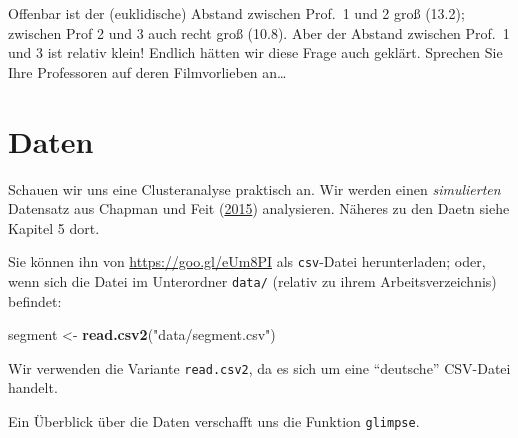 \documentclass[12pt,ngerman,]{book}
\makeatletter
\newenvironment{Shaded}{\begin{snugshade}}{\end{snugshade}}
\newcommand{\KeywordTok}[1]{\textcolor[rgb]{0.13,0.29,0.53}{\textbf{{#1}}}}
\newcommand{\StringTok}[1]{\textcolor[rgb]{0.31,0.60,0.02}{{#1}}}
\newcommand{\CommentTok}[1]{\textcolor[rgb]{0.56,0.35,0.01}{\textit{{#1}}}}
\newcommand{\NormalTok}[1]{{#1}}
\newenvironment{kframe}{%
\medskip{}
\setlength{\fboxsep}{.8em}
 \def\at@end@of@kframe{}%
 \ifinner\ifhmode%
  \def\at@end@of@kframe{\end{minipage}}%
  \begin{minipage}{\columnwidth}%
 \fi\fi%
 \def\FrameCommand##1{\hskip\@totalleftmargin \hskip-\fboxsep
 \colorbox{shadecolor}{##1}\hskip-\fboxsep
     \hskip-\linewidth \hskip-\@totalleftmargin \hskip\columnwidth}%
 \MakeFramed {\advance\hsize-\width
   \@totalleftmargin\z@ \linewidth\hsize
   \@setminipage}}%
 {\par\unskip\endMakeFramed%
 \at@end@of@kframe}
\renewenvironment{Shaded}{\begin{kframe}}{\end{kframe}}
\theoremstyle{definition}
\theoremstyle{definition}
\theoremstyle{remark}
\makeatother
\begin{document}
Offenbar ist der (euklidische) Abstand zwischen Prof.~1 und 2 groß
(13.2); zwischen Prof 2 und 3 auch recht groß (10.8). Aber der Abstand
zwischen Prof.~1 und 3 ist relativ klein! Endlich hätten wir diese Frage
auch geklärt. Sprechen Sie Ihre Professoren auf deren Filmvorlieben
an\ldots{}

\section{Daten}\label{daten}

Schauen wir uns eine Clusteranalyse praktisch an. Wir werden einen
\emph{simulierten} Datensatz aus Chapman und Feit
(\protect\hyperlink{ref-Chapman2015}{2015}) analysieren. Näheres zu den
Daetn siehe Kapitel 5 dort.

Sie können ihn von \url{https://goo.gl/eUm8PI} als \texttt{csv}-Datei
herunterladen; oder, wenn sich die Datei im Unterordner \texttt{data/}
(relativ zu ihrem Arbeitsverzeichnis) befindet:

\begin{Shaded}
\begin{Highlighting}[]
\NormalTok{segment <-}\StringTok{ }\KeywordTok{read.csv2}\NormalTok{(}\StringTok{"data/segment.csv"}\NormalTok{)}
\end{Highlighting}
\end{Shaded}

Wir verwenden die Variante \texttt{read.csv2}, da es sich um eine
``deutsche'' CSV-Datei handelt.

Ein Überblick über die Daten verschafft uns die Funktion
\texttt{glimpse}.

\begin{Shaded}
\end{Shaded}
\end{document}
